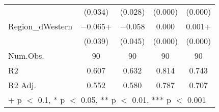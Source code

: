 \begin{table}
\begin{tabular}[t]{lcccc}
 & (\num{0.034}) & (\num{0.028}) & (\num{0.000}) & (\num{0.000})\\
Region\_dWestern & \num{-0.065}+ & \num{-0.058} & \num{0.000} & \num{0.001}+\\
 & (\num{0.039}) & (\num{0.045}) & (\num{0.000}) & (\num{0.000})\\
\midrule
Num.Obs. & \num{90} & \num{90} & \num{90} & \num{90}\\
R2 & \num{0.607} & \num{0.632} & \num{0.814} & \num{0.743}\\
R2 Adj. & \num{0.552} & \num{0.580} & \num{0.787} & \num{0.707}\\
\bottomrule
\multicolumn{5}{l}{\rule{0pt}{1em}+ p $<$ 0.1, * p $<$ 0.05, ** p $<$ 0.01, *** p $<$ 0.001}\\
\end{tabular}
\end{table}
